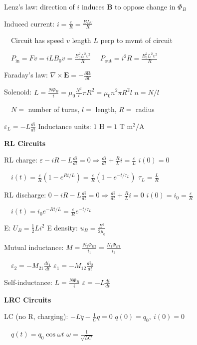 \documentclass[twocolumn]{article}
\begin{document}
Lenz's law: direction of $i$ induces $\mathbf{B}$ to oppose change in $\Phi_B$

Induced current: $i = \frac{\varepsilon}{R} = \frac{BLv}{R}$

$\quad$Circuit has speed $v$ \hfill length $L$ perp to mvmt of circuit

$\quad P_{\text{in}} = Fv = i L B_0 v = \frac{B_0^2 L^2 v^2}{R}$ \hfill $\quad P_{\text{out}} = i^2 R = \frac{B_0^2 L^2 v^2}{R}$

Faraday's law: $\nabla \times \mathbf{E} = -\frac{\partial \mathbf{B}}{\partial t}$

Solenoid: $L = \frac{N \Phi_B}{i} = \mu_0 \frac{N^2}{l} \pi R^2 = \mu_0 n^2 \pi R^2 l$ \hfill $n=N/l$

$\quad N =$ number of turns, $l =$ length, $R =$ radius

$\varepsilon_L = -L \frac{di}{dt}$ \hfill Inductance units: $1 \text{ H} = 1 \text{ T m$^2$/A}$


\cleardoublepage


\textbf{RL Circuits}

RL charge: $\varepsilon - iR - L \frac{di}{dt} = 0 \Longrightarrow \frac{di}{dt} + \frac{R}{L} i = \frac{\varepsilon}{L}$ \hfill $i(0) = 0$

$\quad i(t) = \frac{\varepsilon}{R} (1-e^{Rt/L}) = \frac{\varepsilon}{R} (1-e^{-t/\tau_L})$ \hfill $\tau_L = \frac{L}{R}$

RL discharge: $0 - iR - L \frac{di}{dt} = 0 \Longrightarrow \frac{di}{dt} + \frac{R}{L} i = 0$ \hfill $i(0) = i_0 = \frac{\varepsilon}{R}$

$\quad i(t) = i_0 e^{-Rt/L} = \frac{\varepsilon}{R} e^{-t/\tau_L}$

E: $U_B = \frac{1}{2} Li^2$ \hfill E density: $u_B = \frac{B^2}{2 \mu_0}$

Mutual inductance: $M = \frac{N_2 \Phi_{B2}}{i_1} = \frac{N_1 \Phi_{B1}}{i_2}$

$\quad \varepsilon_2 = -M_{21} \frac{di_1}{dt}$ \hfill $\varepsilon_1 = -M_{12} \frac{di_2}{dt}$

Self-inductance: $L = \frac{N \Phi_B}{i}$ \hfill $\varepsilon = -L \frac{di}{dt}$

\dotfill

\textbf{LRC Circuits}

LC (no R, charging): $-L \ddot{q} - \frac{1}{C} q = 0$ \hfill $q(0) = q_0,\ i(0) = 0$

$\quad q(t) = q_0 \cos \omega t$ \hfill $\omega = \frac{1}{\sqrt{LC}}$
\end{document}
